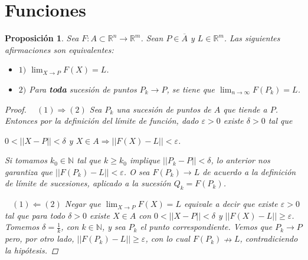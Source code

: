\documentclass[]{article}
\newtheorem{prop}[teo]{Proposición}
\def\N{\mathbb{N}}
\def\R{\mathbb{R}}
\def\e{\varepsilon}
\def\d{\delta}
\begin{document}
\newpage
\section{Funciones}
\begin{prop}
	Sea $F:A \subset \R^n \to \R^m$. Sean $P \in \overline{A}$ y $L \in \R^m$. Las siguientes afirmaciones son equivalentes:
	\begin{itemize}
		\item $1)$ $\displaystyle \lim_{X \to P} F(X) = L$.
		\item $2)$ Para \textbf{toda} sucesión de puntos $P_k \rightarrow P$, se tiene que $\displaystyle \lim_{n \to \infty} F(P_k) = L$.
	\end{itemize}
	\begin{proof}
		~\newline	
		$(1) \Rightarrow (2)$ Sea $P_k$ una sucesión de puntos de $A$ que tiende a $P$. Entonces por la definición del límite de función, dado $\e > 0$ existe $\delta > 0$ tal que
		\begin{center}
			$0 < ||X-P|| < \delta$ y $X \in A \Rightarrow ||F(X)-L||<\e$.
		\end{center}
		Si tomamos $k_0 \in \N$ tal que $k \geq k_0$ implique $||P_k - P|| < \d$, lo anterior nos garantiza que $||F(P_k)-L|| < \e $. O sea $F(P_k) \to L$ de acuerdo a la definición de límite de sucesiones, aplicado a la sucesión $Q_k=F(P_k)$.
		
		~\newline	
		$(1) \Leftarrow (2)$ Negar que $\displaystyle \lim_{X \to P} F(X) = L$ equivale a decir que existe $\e > 0$ tal que para todo $\d > 0$ existe $X \in A$ con $0<||X-P||<\d$ y $||F(X)-L|| \geq \e$. Tomemos $\d = \frac{1}{k}$, con $k \in \N$, y sea $P_k$ el punto correspondiente. Vemos que $P_k \rightarrow P$ pero, por otro lado, $||F(P_k) - L|| \geq \e$, con lo cual $F(P_k) \nrightarrow	 L$, contradiciendo la hipótesis.
	\end{proof}
\end{prop}
\end{document}
